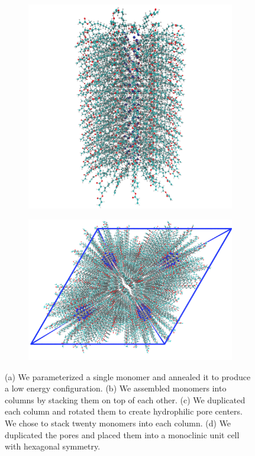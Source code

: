 \documentclass[journal=jpcbfk,manuscript=article]{achemso}
\begin{document}
\begin{figure}[!htb]
\begin{subfigure}[t]{0.42\textwidth}
  \caption{}
  \end{subfigure}
  \begin{subfigure}[t]{0.35\textwidth}
  \includegraphics[width=\linewidth]{initial_pore.png}
  \caption{}
  \end{subfigure}
  \begin{subfigure}[t]{0.45\textwidth}
  \includegraphics[width=\linewidth]{initial_unit_cell.png}
  \caption{}
  \end{subfigure}
  \caption{(a) We parameterized a single monomer and annealed it to produce a low energy
		configuration. (b) We assembled monomers into columns by stacking them on top of each 
		other. (c) We duplicated each column and rotated them to create hydrophilic pore centers.
		We chose to stack twenty monomers into each column. (d) We duplicated the pores and 
		placed them into a monoclinic unit cell with hexagonal symmetry.}\label{fig:build_procedure}
  \end{figure}
  
\end{document}
